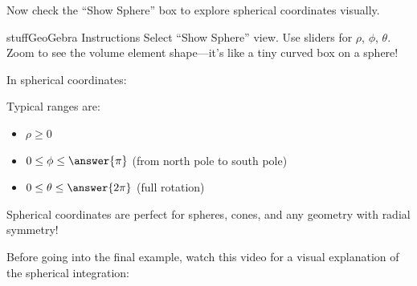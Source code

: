 \documentclass{ximera}
\begin{document}
\begin{problem}
Now check the ``Show Sphere'' box to explore spherical coordinates visually.

\begin{expandable}{stuff}{GeoGebra Instructions}
    Select ``Show Sphere'' view. Use sliders for $\rho$, $\phi$, $\theta$. Zoom to see the volume element shape—it's like a tiny curved box on a sphere!
\end{expandable}

\begin{center}
\end{center}

In spherical coordinates:
\begin{selectAll}
\end{selectAll}

Typical ranges are:
\begin{itemize}
    \item $\rho \geq 0$
    \item $0 \leq \phi \leq \answer{\pi}$ (from north pole to south pole)
    \item $0 \leq \theta \leq \answer{2\pi}$ (full rotation)
\end{itemize}

\begin{feedback}
Spherical coordinates are perfect for spheres, cones, and any geometry with radial symmetry!
\end{feedback}
\end{problem}

Before going into the final example, watch this video for a visual explanation of the spherical integration:


\end{document}
